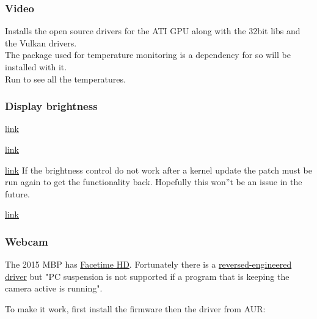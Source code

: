 \subsubsection{Video}
\begin{blocksection}
    Installs the open source drivers for the ATI GPU along with the 32bit libs and the Vulkan drivers.\\
    The \href{https://wiki.archlinux.org/index.php/Lm_sensors}{} package used for temperature monitoring is a dependency for  so will be installed with it.\\
    Run  to see all the temperatures.
\end{blocksection}

\subsubsection{Display brightness}

\href{https://github.com/0xbb/apple_set_os.efi}{link}

\href{https://github.com/Dunedan/mbp-2016-linux/issues/38}{link}


\href{https://bugzilla.kernel.org/show_bug.cgi?id=105051#c37}{link}
If the brightness control do not work after a kernel update the patch must be run again to get the functionality back. Hopefully this won''t be an issue in the future.


\href{https://bugzilla.kernel.org/show_bug.cgi?id=105051#c39}{link}

\subsubsection{Webcam}

The 2015 MBP has \href{https://wiki.archlinux.org/index.php/MacBook#Facetime_HD}{Facetime HD}.
Fortunately there is a \href{https://github.com/patjak/bcwc_pcie}{reversed-engineered driver} but "PC suspension is not supported if a 
program that is keeping the camera active is running".

To make it work, first install the firmware then the driver from AUR:


